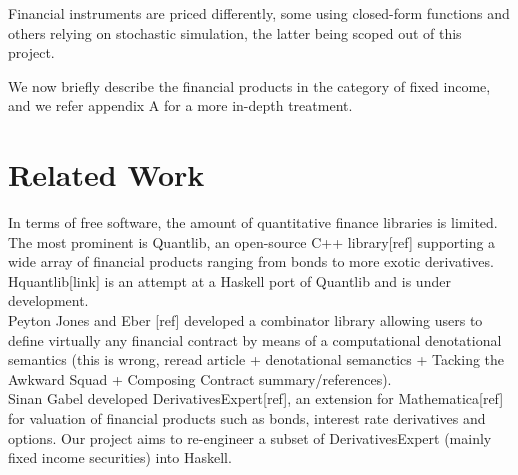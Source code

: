 Financial instruments are priced differently, some using closed-form functions and others relying on stochastic simulation, the latter being scoped out of this project.

We now briefly describe the financial products in the category of fixed income, and we refer appendix A for a more in-depth treatment.

\section{Related Work}

In terms of free software, the amount of quantitative finance libraries is limited.
The most prominent is Quantlib, an open-source C++ library[ref] supporting a wide array of financial products ranging from bonds to more exotic derivatives.\\

Hquantlib[link] is an attempt at a Haskell port of Quantlib and is under development.\\

Peyton Jones and Eber [ref] developed a combinator library allowing users to define virtually any financial contract by means of a computational denotational semantics (this is wrong, reread article + denotational semanctics + Tacking the Awkward Squad + Composing Contract summary/references).\\

Sinan Gabel developed DerivativesExpert[ref], an extension for Mathematica[ref] for valuation of financial products such as bonds, interest rate derivatives and options. Our project aims to re-engineer a subset of DerivativesExpert (mainly fixed income securities) into Haskell.
